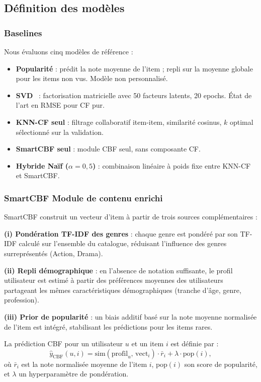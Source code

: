 \documentclass[conference]{IEEEtran}
\begin{document}
\subsection{Définition des modèles}

\subsubsection{Baselines}

Nous évaluons cinq modèles de référence :
\begin{itemize}
    \item \textbf{Popularité} : prédit la note moyenne de l'item ; repli sur
          la moyenne globale pour les items non vus. Modèle non personnalisé.
    \item \textbf{SVD}~\cite{koren2009} : factorisation matricielle avec
          50 facteurs latents, 20 epochs. État de l'art en RMSE pour CF pur.
    \item \textbf{KNN-CF seul} : filtrage collaboratif item-item, similarité
          cosinus, $k$ optimal sélectionné sur la validation.
    \item \textbf{SmartCBF seul} : module CBF seul, sans composante CF.
    \item \textbf{Hybride Naïf ($\alpha=0{,}5$)} : combinaison linéaire à
          poids fixe entre KNN-CF et SmartCBF.
\end{itemize}

\subsubsection{SmartCBF Module de contenu enrichi}

SmartCBF construit un vecteur d'item à partir de trois sources complémentaires :

\textbf{(i) Pondération TF-IDF des genres} : chaque genre est pondéré par son
TF-IDF calculé sur l'ensemble du catalogue, réduisant l'influence des genres
surreprésentés (Action, Drama).

\textbf{(ii) Repli démographique} : en l'absence de notation suffisante, le
profil utilisateur est estimé à partir des préférences moyennes des utilisateurs
partageant les mêmes caractéristiques démographiques (tranche d'âge, genre,
profession).

\textbf{(iii) Prior de popularité} : un biais additif basé sur la note moyenne
normalisée de l'item est intégré, stabilisant les prédictions pour les items
rares.

La prédiction CBF pour un utilisateur $u$ et un item $i$ est définie par :
\begin{equation}
\hat{y}_{\text{CBF}}(u,i) = \text{sim}(\text{profil}_u,\, \text{vect}_i)
  \cdot \bar{r}_i + \lambda \cdot \text{pop}(i),
\label{eq:smartcbf}
\end{equation}
où $\bar{r}_i$ est la note normalisée moyenne de l'item $i$, $\text{pop}(i)$
son score de popularité, et $\lambda$ un hyperparamètre de pondération.
\end{document}
